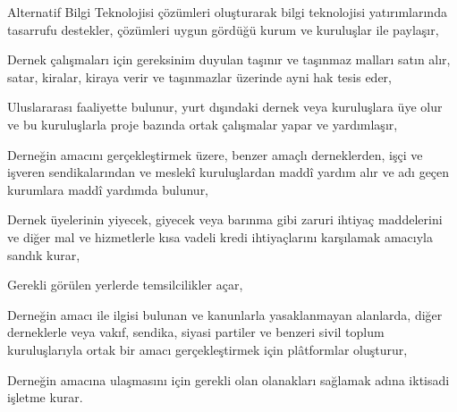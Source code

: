 \documentclass{tuzuk}
\begin{document}
{\begin{fikra}
    \item Alternatif Bilgi Teknolojisi çözümleri oluşturarak bilgi teknolojisi yatırımlarında tasarrufu destekler, çözümleri uygun gördüğü kurum ve kuruluşlar ile paylaşır,
    \item Dernek çalışmaları için gereksinim duyulan taşınır ve taşınmaz malları satın alır, satar, kiralar, kiraya verir ve taşınmazlar üzerinde ayni hak tesis eder,
    \item Uluslararası faaliyette bulunur, yurt dışındaki dernek veya kuruluşlara üye olur ve bu kuruluşlarla proje bazında ortak çalışmalar yapar ve yardımlaşır,
    \item Derneğin amacını gerçekleştirmek üzere, benzer amaçlı derneklerden, işçi ve işveren sendikalarından ve meslekî kuruluşlardan maddî yardım alır ve adı geçen kurumlara maddî yardımda bulunur,
    \item Dernek üyelerinin yiyecek, giyecek veya barınma gibi zaruri ihtiyaç maddelerini ve diğer mal ve hizmetlerle kısa vadeli kredi ihtiyaçlarını karşılamak amacıyla sandık kurar,
    \item Gerekli görülen yerlerde temsilcilikler açar,
    \item Derneğin amacı ile ilgisi bulunan ve kanunlarla yasaklanmayan alanlarda, diğer derneklerle veya vakıf, sendika, siyasi partiler ve benzeri sivil toplum kuruluşlarıyla ortak bir amacı gerçekleştirmek için plâtformlar oluşturur,
    \item Derneğin amacına ulaşmasını için gerekli olan olanakları sağlamak adına iktisadi işletme kurar.

\end{fikra}
}
\end{document}
